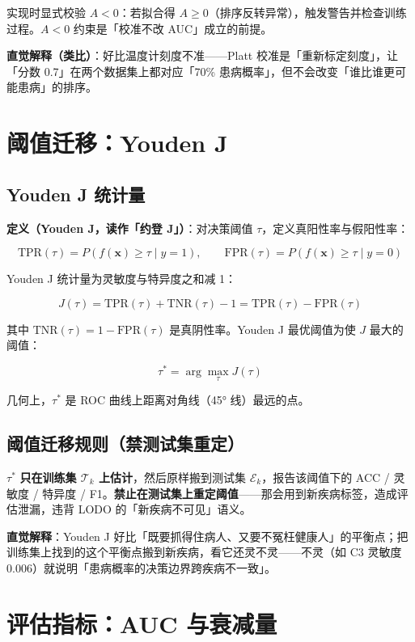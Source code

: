 \documentclass{internal-report}
\begin{document}
实现时显式校验 $A<0$：若拟合得 $A\ge 0$（排序反转异常），触发警告并检查训练过程。$A<0$ 约束是「校准不改 AUC」成立的前提。

\textbf{直觉解释（类比）}：好比温度计刻度不准——Platt 校准是「重新标定刻度」，让「分数 0.7」在两个数据集上都对应「70\% 患病概率」，但不会改变「谁比谁更可能患病」的排序。

\section{阈值迁移：Youden J}

\subsection{Youden J 统计量}

\textbf{定义（Youden J，读作「约登 J」）}：对决策阈值 $\tau$，定义真阳性率与假阳性率：

$$
\text{TPR}(\tau) = P(f(\mathbf{x}) \ge \tau \mid y=1), \qquad \text{FPR}(\tau) = P(f(\mathbf{x}) \ge \tau \mid y=0)
$$

Youden J 统计量为灵敏度与特异度之和减 1：

$$
J(\tau) = \text{TPR}(\tau) + \text{TNR}(\tau) - 1 = \text{TPR}(\tau) - \text{FPR}(\tau)
$$

其中 $\text{TNR}(\tau)=1-\text{FPR}(\tau)$ 是真阴性率。Youden J 最优阈值为使 $J$ 最大的阈值：

$$
\tau^{*} = \arg\max_{\tau} J(\tau)
$$

几何上，$\tau^{*}$ 是 ROC 曲线上距离对角线（45° 线）最远的点。

\subsection{阈值迁移规则（禁测试集重定）}

$\tau^{*}$ \textbf{只在训练集 $\mathcal{T}_k$ 上估计}，然后原样搬到测试集 $\mathcal{E}_k$，报告该阈值下的 ACC / 灵敏度 / 特异度 / F1。\textbf{禁止在测试集上重定阈值}——那会用到新疾病标签，造成评估泄漏，违背 LODO 的「新疾病不可见」语义。

\textbf{直觉解释}：Youden J 好比「既要抓得住病人、又要不冤枉健康人」的平衡点；把训练集上找到的这个平衡点搬到新疾病，看它还灵不灵——不灵（如 C3 灵敏度 0.006）就说明「患病概率的决策边界跨疾病不一致」。

\section{评估指标：AUC 与衰减量}
\end{document}
